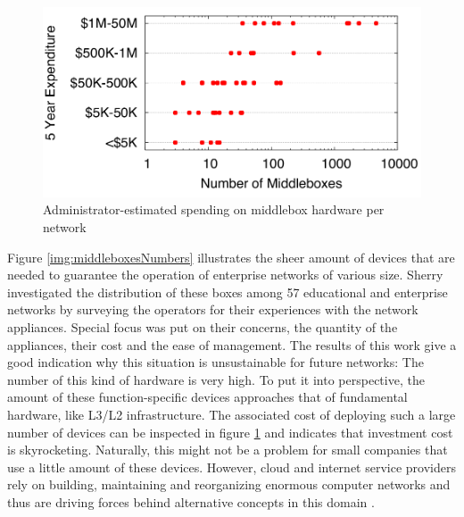 \begin{figure}[h]
	\centering
	\includegraphics[width=1\linewidth]{images/middleboxesCost.png}
	\caption{Administrator-estimated spending on middlebox hardware per network \cite{sherry2016middleboxes}}
	\label{img:middleboxesCost}
\end{figure}
\newpage
Figure \ref{img:middleboxesNumbers} illustrates the sheer amount of devices that are needed to guarantee the operation of enterprise networks of various size. Sherry \cite{sherry2016middleboxes} \cite{sherry2012survey}  investigated the distribution of these boxes among 57 educational and enterprise networks by surveying the operators for their experiences with the network appliances. Special focus was put on their concerns, the quantity of the appliances, their cost and the ease of management. The results of this work give a good indication why this situation is unsustainable for future networks:  The number of this kind of hardware is very high. To put it into perspective, the amount of these function-specific devices approaches that of fundamental hardware,  like L3/L2 infrastructure. The associated cost of deploying such a large number of devices can be inspected in figure \ref{img:middleboxesCost} and indicates that investment cost is skyrocketing. Naturally, this might not be a problem for small companies that use a little amount of these devices. However, cloud and internet service providers rely on building, maintaining and reorganizing enormous computer networks and thus are driving forces behind alternative concepts in this domain \cite{sherry2016middleboxes} \cite{sherry2012survey}.

